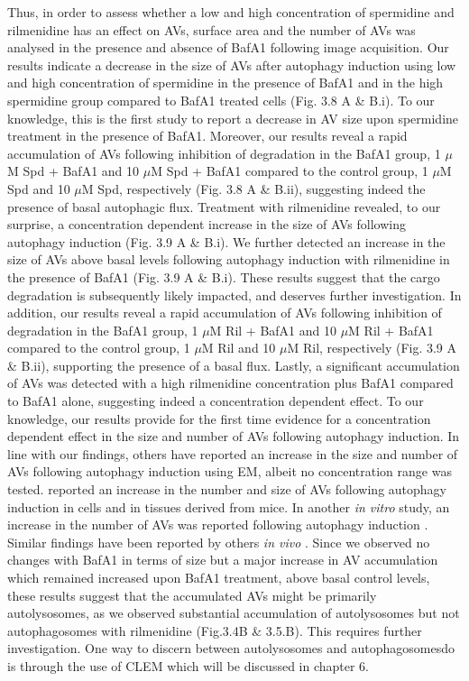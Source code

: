 {Thus, in order to assess whether a low and high concentration of spermidine and rilmenidine has an effect on AVs, surface area and the number of AVs was analysed in the presence and absence of BafA1 following image acquisition. Our results indicate a decrease in the size of AVs after autophagy induction using low and high concentration of spermidine in the presence of BafA1 and in the high spermidine group compared to BafA1 treated cells (Fig. 3.8 A \& B.i). To our knowledge, this is the first study to report a decrease in AV size upon spermidine treatment in the presence of BafA1. Moreover, our results reveal a rapid accumulation of AVs following inhibition of degradation in the BafA1 group, 1 $\mu$M Spd + BafA1 and 10 $\mu$M Spd + BafA1 compared to the control group, 1 $\mu$M Spd and 10 $\mu$M Spd, respectively (Fig. 3.8 A \& B.ii), suggesting indeed the presence of basal autophagic flux.  Treatment with rilmenidine revealed, to our surprise, a concentration dependent increase in the size of AVs following autophagy induction (Fig. 3.9 A \& B.i). We further detected an increase in the size of AVs above basal levels following autophagy induction with rilmenidine in the presence of BafA1 (Fig. 3.9 A \& B.i). These results suggest that the cargo degradation is subsequently likely impacted, and deserves further investigation. In addition, our results reveal a rapid accumulation of AVs following inhibition of degradation in the BafA1 group, 1 $\mu$M Ril + BafA1 and 10 $\mu$M Ril + BafA1 compared to the control group, 1 $\mu$M Ril and 10 $\mu$M Ril, respectively (Fig. 3.9 A \& B.ii), supporting the presence of a basal flux. Lastly, a significant accumulation of AVs was detected with a high rilmenidine concentration plus BafA1 compared to BafA1 alone, suggesting indeed a concentration dependent effect.  To our knowledge, our results provide for the first time evidence for a concentration dependent effect in the size and number of AVs following autophagy induction.  In line with our findings, others have reported an increase in the size and number of AVs following autophagy induction using EM, albeit no concentration range was tested. \citet{Mizushima2004a} reported an increase in the number and size of AVs following autophagy induction in cells and in tissues derived from mice. In another \textit{in vitro} study, an increase in the number of AVs was reported  following autophagy induction \citep{Lum2005}. Similar findings have been reported by others \textit{in vivo} \citep{Alirezaei2010,Ericsson1969,Mizushima2004a}. Since we observed no changes with BafA1 in terms of size but a major increase in AV accumulation which remained increased upon BafA1 treatment, above basal control levels, these results suggest that the accumulated AVs might be primarily autolysosomes, as we observed substantial accumulation of autolysosomes but not autophagosomes with rilmenidine (Fig.3.4B \& 3.5.B). This requires further investigation. One way to discern between autolysosomes and autophagosomesdo is through the use of CLEM which will be discussed in chapter 6.
}
